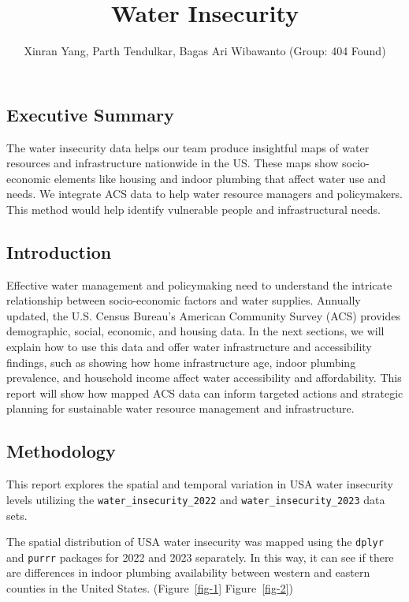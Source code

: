 \documentclass[
  letterpaper,
  DIV=11,
  numbers=noendperiod]{scrartcl}
\title{Water Insecurity}
\author{Xinran Yang, Parth Tendulkar, Bagas Ari Wibawanto (Group: 404
Found)}
\date{}
\begin{document}
\maketitle


\subsection{Executive Summary}\label{executive-summary}

The water insecurity data helps our team produce insightful maps of
water resources and infrastructure nationwide in the US. These maps show
socio-economic elements like housing and indoor plumbing that affect
water use and needs. We integrate ACS data to help water resource
managers and policymakers. This method would help identify vulnerable
people and infrastructural needs.

\subsection{Introduction}\label{introduction}

Effective water management and policymaking need to understand the
intricate relationship between socio-economic factors and water
supplies. Annually updated, the U.S. Census Bureau's American Community
Survey (ACS) provides demographic, social, economic, and housing data.
In the next sections, we will explain how to use this data and offer
water infrastructure and accessibility findings, such as showing how
home infrastructure age, indoor plumbing prevalence, and household
income affect water accessibility and affordability. This report will
show how mapped ACS data can inform targeted actions and strategic
planning for sustainable water resource management and infrastructure.

\subsection{Methodology}\label{methodology}

This report explores the spatial and temporal variation in USA water
insecurity levels utilizing the \texttt{water\_insecurity\_2022} and
\texttt{water\_insecurity\_2023} data sets.

The spatial distribution of USA water insecurity was mapped using the
\texttt{dplyr} and \texttt{purrr} packages for 2022 and 2023 separately.
In this way, it can see if there are differences in indoor plumbing
availability between western and eastern counties in the United States.
(Figure~\ref{fig-1} Figure~\ref{fig-2})
\end{document}
